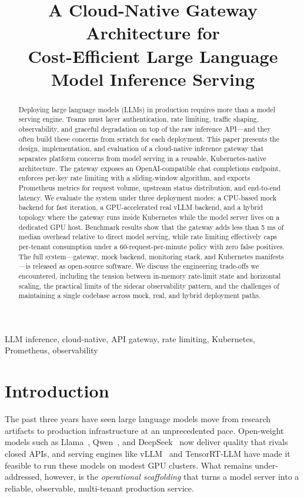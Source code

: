 \documentclass[10pt,journal]{IEEEtran}
\title{A Cloud-Native Gateway Architecture for\\Cost-Efficient Large Language Model Inference Serving}
\author{
  \IEEEauthorblockN{Anonymous Author(s)}
  \IEEEauthorblockA{
    \textit{Department of Computer Science and Engineering}\\
    \textit{University / Research Institute}\\
    City, Country\\
    \texttt{email@example.com}
  }
}
\begin{document}
\maketitle

\begin{abstract}
Deploying large language models (LLMs) in production requires more than a model serving engine. Teams must layer authentication, rate limiting, traffic shaping, observability, and graceful degradation on top of the raw inference API---and they often build these concerns from scratch for each deployment. This paper presents the design, implementation, and evaluation of a cloud-native inference gateway that separates platform concerns from model serving in a reusable, Kubernetes-native architecture. The gateway exposes an OpenAI-compatible chat completions endpoint, enforces per-key rate limiting with a sliding-window algorithm, and exports Prometheus metrics for request volume, upstream status distribution, and end-to-end latency. We evaluate the system under three deployment modes: a CPU-based mock backend for fast iteration, a GPU-accelerated real vLLM backend, and a hybrid topology where the gateway runs inside Kubernetes while the model server lives on a dedicated GPU host. Benchmark results show that the gateway adds less than 5 ms of median overhead relative to direct model serving, while rate limiting effectively caps per-tenant consumption under a 60-request-per-minute policy with zero false positives. The full system---gateway, mock backend, monitoring stack, and Kubernetes manifests---is released as open-source software. We discuss the engineering trade-offs we encountered, including the tension between in-memory rate-limit state and horizontal scaling, the practical limits of the sidecar observability pattern, and the challenges of maintaining a single codebase across mock, real, and hybrid deployment paths.
\end{abstract}

\begin{IEEEkeywords}
LLM inference, cloud-native, API gateway, rate limiting, Kubernetes, Prometheus, observability
\end{IEEEkeywords}

\section{Introduction}\label{sec:intro}

The past three years have seen large language models move from research artifacts to production infrastructure at an unprecedented pace. Open-weight models such as Llama~\cite{touvron2023llama}, Qwen~\cite{bai2023qwen}, and DeepSeek~\cite{deepseek2024} now deliver quality that rivals closed APIs, and serving engines like vLLM~\cite{kwon2023efficient} and TensorRT-LLM have made it feasible to run these models on modest GPU clusters. What remains under-addressed, however, is the \emph{operational scaffolding} that turns a model server into a reliable, observable, multi-tenant production service.
\end{document}
